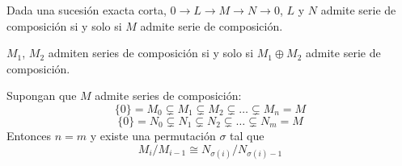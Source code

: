 \begin{cor}
  Dada una sucesión exacta corta, \(0\longrightarrow L
  \longrightarrow M\longrightarrow N\longrightarrow 0\),
  \(L\) y \(N\) admite serie de composición si y solo si
  \(M\) admite serie de composición.
\end{cor}

\begin{cor}
  \(M_1\), \(M_2\) admiten series de composición si y solo si
  \(M_1\oplus M_2\) admite serie de composición.
\end{cor}


\begin{teo}
  Supongan que \(M\) admite series de composición:
  \[
    \{0\}=M_0\subsetneq M_1\subsetneq M_2\subsetneq\ldots\subsetneq M_n=M
  \]
  \[
    \{0\}=N_0\subsetneq N_1\subsetneq N_2\subsetneq\ldots\subsetneq N_m=M
  \]
  Entonces \(n=m\) y existe una permutación \(\sigma\) tal que
  \[
    M_i/M_{i-1}\cong N_{\sigma(i)}/N_{\sigma(i)-1}
  \]
\end{teo}
